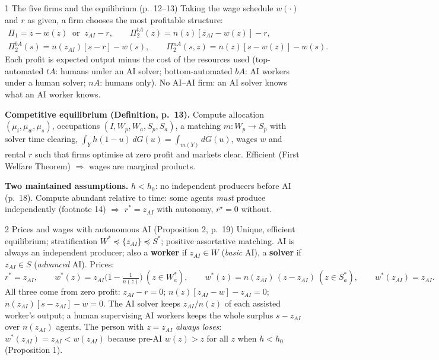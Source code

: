 \documentclass[aspectratio=169,11pt]{beamer}
\begin{document}
\begin{frame}{1 \textperiodcentered{} The five firms and the equilibrium (p.\ 12--13)}
  \footnotesize
  Taking the wage schedule $w(\cdot)$ and $r$ as given, a firm chooses the most profitable structure:
  \begin{gather*}
    \Pi_1 = z-w(z)\ \text{ or }\ z_{AI}-r,\qquad
    \Pi_2^{tA}(z)=n(z)[z_{AI}-w(z)]-r,\\
    \Pi_2^{bA}(s)=n(z_{AI})[s-r]-w(s),\qquad
    \Pi_2^{nA}(s,z)=n(z)[s-w(z)]-w(s).
  \end{gather*}
  Each profit is expected output minus the cost of the resources used (top-automated $tA$: humans under an AI solver;
  bottom-automated $bA$: AI workers under a human solver; $nA$: humans only). No AI--AI firm: an AI solver knows what an
  AI worker knows.

  \smallskip
  \textbf{Competitive equilibrium (Definition, p.\ 13).} Compute allocation $(\mu_i,\mu_w,\mu_s)$, occupations
  $(I,W_p,W_a,S_p,S_a)$, a matching $m:W_p\to S_p$ with solver time clearing,
  $\int_Y h(1-u)\,dG(u)=\int_{m(Y)}dG(u)$, wages $w$ and rental $r$ such that firms optimise at zero profit and markets
  clear. Efficient (First Welfare Theorem) $\Rightarrow$ wages are marginal products.

  \smallskip
  \textbf{Two maintained assumptions.} $h<h_0$: no independent producers before AI (p.\ 18). Compute abundant relative
  to time: some agents \emph{must} produce independently (footnote 14) $\Rightarrow$ $r^*=z_{AI}$ with autonomy,
  $r^\star=0$ without.
\end{frame}

\begin{frame}{2 \textperiodcentered{} Prices and wages with autonomous AI (Proposition 2, p.\ 19)}
  \footnotesize
  Unique, efficient equilibrium; stratification $W^*\preceq\{z_{AI}\}\preceq S^*$; positive assortative matching.
  AI is always an independent producer; also a \textbf{worker} if $z_{AI}\in W$ (\emph{basic} AI), a \textbf{solver}
  if $z_{AI}\in S$ (\emph{advanced} AI). Prices:
  \[
    r^*=z_{AI},\qquad
    w^*(z)=z_{AI}\Big(1-\tfrac{1}{n(z)}\Big)\ (z\in W^*_a),\qquad
    w^*(z)=n(z_{AI})\,(z-z_{AI})\ (z\in S^*_a),\qquad w^*(z_{AI})=z_{AI}.
  \]
  All three come from zero profit: $z_{AI}-r=0$; $n(z)[z_{AI}-w]-z_{AI}=0$; $n(z_{AI})[s-z_{AI}]-w=0$.
  The AI solver keeps $z_{AI}/n(z)$ of each assisted worker's output; a human supervising AI workers keeps the whole
  surplus $s-z_{AI}$ over $n(z_{AI})$ agents. The person with $z=z_{AI}$ \emph{always loses}: $w^*(z_{AI})=z_{AI}<w(z_{AI})$
  because pre-AI $w(z)>z$ for all $z$ when $h<h_0$ (Proposition 1).
\end{frame}
\end{document}
